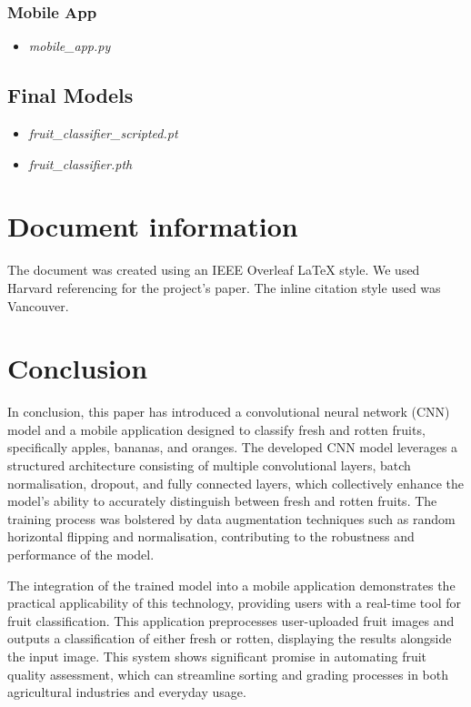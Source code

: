 \documentclass[conference]{IEEEtran}
\begin{document}
\subsubsection{Mobile App}
\begin{itemize}
    \item \textit{mobile\_app.py}
\end{itemize}

\subsection{Final Models}
\begin{itemize}
    \item \textit{fruit\_classifier\_scripted.pt}
    \item \textit{fruit\_classifier.pth}
\end{itemize}


\section{Document information}
The document was created using an IEEE Overleaf LaTeX style.  We used Harvard referencing for the project's paper. The inline citation style used was Vancouver.

\section{Conclusion}

In conclusion, this paper has introduced a convolutional neural network (CNN) model and a mobile application designed to classify fresh and rotten fruits, specifically apples, bananas, and oranges. The developed CNN model leverages a structured architecture consisting of multiple convolutional layers, batch normalisation, dropout, and fully connected layers, which collectively enhance the model's ability to accurately distinguish between fresh and rotten fruits. The training process was bolstered by data augmentation techniques such as random horizontal flipping and normalisation, contributing to the robustness and performance of the model.

The integration of the trained model into a mobile application demonstrates the practical applicability of this technology, providing users with a real-time tool for fruit classification. This application preprocesses user-uploaded fruit images and outputs a classification of either fresh or rotten, displaying the results alongside the input image. This system shows significant promise in automating fruit quality assessment, which can streamline sorting and grading processes in both agricultural industries and everyday usage.
\end{document}
